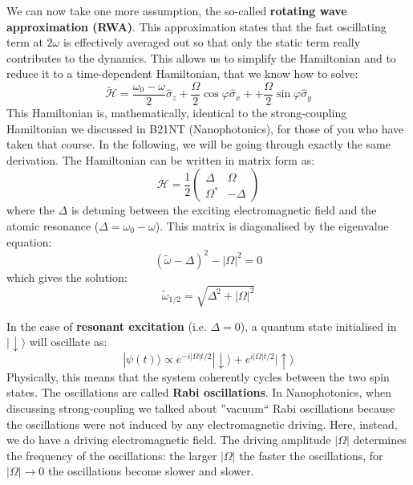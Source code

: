 \documentclass[a4paper,11pt]{article}
\newcommand{\ket}[1]{| #1 \rangle}
\newcommand{\beq}{\begin{equation}}
\newcommand{\eeq}{\end{equation}}
\begin{document}
We can now take one more assumption, the so-called {\bf rotating wave approximation (RWA)}. This approximation states that the fast oscillating term at $2 \omega$ is effectively averaged out so that only the static term really contributes to the dynamics. This allows us to simplify the Hamiltonian and to reduce it to a time-dependent Hamiltonian, that we know how to solve:
\begin{equation}
 \widetilde{\mathcal{H}} = \frac{\omega_0-\omega}{2}\hat{\sigma}_z + \frac{\Omega}{2} \cos\varphi \hat{\sigma}_x + + \frac{\Omega}{2} \sin\varphi \hat{\sigma}_y 
\end{equation}
\newline This Hamiltonian is, mathematically, identical to the strong-coupling Hamiltonian we discussed in B21NT (Nanophotonics), for those of you who have taken that course. In the following, we will be going through exactly the same derivation.
\newline The Hamiltonian can be written in matrix form as:
\beq
\label{eq:rabi_H}
\mathcal{H} = \frac{1}{2}\left(\begin{array}{cc}
\Delta & \Omega\\
\Omega^* & -\Delta
\end{array} \right)
\eeq
where the $\Delta$ is detuning between the exciting electromagnetic field and the atomic resonance ($\Delta = \omega_0 - \omega$). 
This matrix is diagonalised by the eigenvalue equation:
\begin{equation}
 (\widetilde{\omega} - \Delta)^2 - |\Omega|^2=0
 \end{equation}
which gives the solution:
\begin{equation}
\label{eq:rabi_frq}
 \widetilde{\omega}_{1/2} = \sqrt{\Delta^2 + |\Omega|^2 }
\end{equation}

In the case of {\bf resonant excitation} (i.e. $\Delta = 0$), a quantum state initialised in $\ket{\downarrow}$ will oscillate as:
\begin{equation}
\label{eq:rabi_evol}
 \ket{\psi (t)} \propto  e^{-i |\Omega| t/2} \ket{\downarrow} + e^{i |\Omega| t/2} \ket{\uparrow}
\end{equation}
Physically, this means that the system coherently  cycles between the two spin states. The oscillations are called {\bf Rabi oscillations}. In Nanophotonics, when discussing strong-coupling we talked about ''vacuum`` Rabi oscillations because the oscillations were not induced by any electromagnetic driving. Here, instead, we do have a driving electromagnetic field. 
\newline The driving amplitude $|\Omega|$ determines the frequency of the oscillations: the larger $|\Omega|$ the faster the oscillations, for $|\Omega| \rightarrow 0$ the oscillations become slower and slower.
\end{document}
